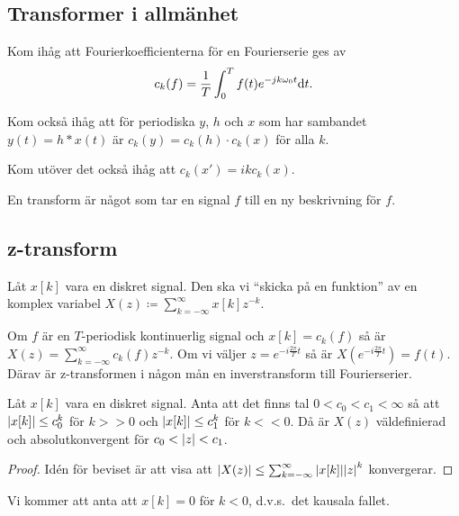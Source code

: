 \documentclass[a4paper]{article}
\begin{document}
\providecommand\fname{}
\renewcommand\fname{19-10-10}

\subsection{Transformer i allmänhet}
Kom ihåg att Fourierkoefficienterna för en Fourierserie ges av \[
    c_k(f) = \frac{1}{T} \int_0^T f(t) e^{-jk\omega_0 t} \dd t.
\] 

Kom också ihåg att för periodiska \(
    y
\), \(
    h
\) och \(
    x
\) som har sambandet \(
    y(t) = h*x(t)
\) är \(
    c_k(y) = c_k(h) \cdot c_k(x)
\) för alla \(
    k
\).

Kom utöver det också ihåg att \(
    c_k(x') = i k c_k(x)
\).

En transform är något som tar en signal \(
    f
\) till en ny beskrivning för \(
    f
\).

\subsection{z-transform}
Låt \(
    x[k]
\) vara en diskret signal. Den ska vi \enquote{skicka på en funktion} av en 
komplex variabel \(
    X(z) \coloneqq \sum_{k=-\infty}^\infty x[k] z^{-k}
\). 

Om \(
    f
\) är en \(
    T
\)-periodisk kontinuerlig signal och \(
    x[k] = c_k(f)
\) så är \(
    X(z) = \sum_{k=-\infty}^\infty c_k(f) z^{-k}
\). Om vi väljer \(
    z = e^{-i \frac{2\pi}{T} t}
\) så är \(
    X(e^{-i \frac{2\pi}{T} t}) = f(t)
\). Därav är z-transformen i någon mån en inverstransform till Fourierserier.

\begin{påst}
    Låt \(
        x[k]
    \) vara en diskret signal. Anta att det finns tal \(
        0 < c_0 < c_1 < \infty 
    \) så att \(
        \abs{x[k]} \leq c_0^k 
    \) för \(
        k >> 0
    \) och \(
        \abs{x[k]} \leq c_1^k 
    \) för \(
        k << 0
    \). Då är \(
        X(z)
    \) väldefinierad och absolutkonvergent för \(
        c_0 < \abs{z} < c_1
    \).

    \begin{proof}
        Idén för beviset är att visa att \(
            \abs{X(z)} \leq \sum_{k=-\infty}^\infty \abs{x[k]} \abs{z}^k
        \) konvergerar.
    \end{proof}
\end{påst}

Vi kommer att anta att \(
    x[k]=0
\) för \(
    k < 0
\), d.v.s.\ det kausala fallet. 
\end{document}
